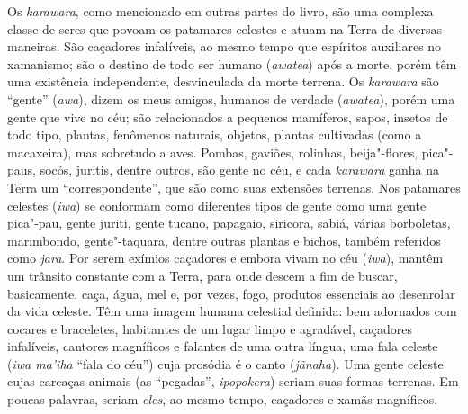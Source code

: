 \noindent Os \emph{karawara}, como mencionado em outras partes do livro, são uma
complexa classe de seres que povoam os patamares celestes e atuam na
Terra de diversas maneiras. São caçadores infalíveis, ao mesmo tempo que
espíritos auxiliares no xamanismo; são o destino de todo ser humano
(\emph{awatea}) após a morte, porém têm uma existência independente,
desvinculada da morte terrena. Os \emph{karawara} são ``gente''
(\emph{awa}), dizem os meus amigos, humanos de verdade (\emph{awatea}),
porém uma gente que vive no céu; são relacionados a pequenos mamíferos,
sapos, insetos de todo tipo, plantas, fenômenos naturais, objetos,
plantas cultivadas (como a macaxeira), mas sobretudo a aves. Pombas,
gaviões, rolinhas, beija"-flores, pica"-paus, socós, juritis, dentre
outros, são gente no céu, e cada \emph{karawara} ganha na Terra um
``correspondente'', que são como suas extensões terrenas. Nos patamares
celestes (\emph{iwa}) se conformam como diferentes tipos de gente como
uma gente pica"-pau, gente juriti, gente tucano, papagaio, siricora,
sabiá, várias borboletas, marimbondo, gente"-taquara, dentre outras
plantas e bichos, também referidos como \emph{jara}. Por serem exímios
caçadores e embora vivam no céu (\emph{iwa}), mantêm um trânsito
constante com a Terra, para onde descem a fim de buscar, basicamente,
caça, água, mel e, por vezes, fogo, produtos essenciais ao desenrolar da
vida celeste. Têm uma imagem humana celestial definida: bem adornados
com cocares e braceletes, habitantes de um lugar limpo e agradável,
caçadores infalíveis, cantores magníficos e falantes de uma outra
língua, uma fala celeste (\emph{iwa ma'iha} ``fala do céu'') cuja
prosódia é o canto (\emph{jãnaha}). Uma gente celeste cujas carcaças
animais (as ``pegadas'', \emph{ipopokera}) seriam suas formas terrenas.
Em poucas palavras, seriam \emph{eles}, ao mesmo tempo, caçadores e
xamãs magníficos.

